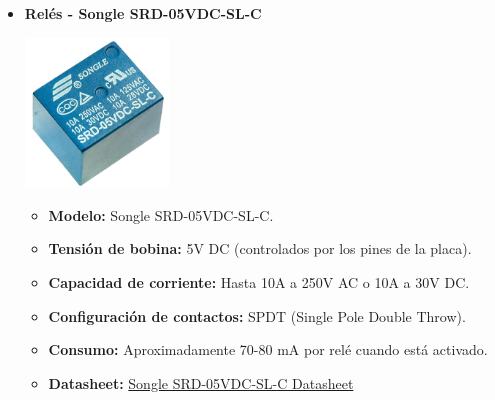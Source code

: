\begin{itemize}
    \item \textbf{Relés - Songle SRD-05VDC-SL-C} 
    \begin{center}
        \includegraphics[width=0.3\textwidth]{Imagenes/rele component.png}
    \end{center}
    \begin{itemize}
        \item \textbf{Modelo:} Songle SRD-05VDC-SL-C.
        \item \textbf{Tensión de bobina:} 5V DC (controlados por los pines de la placa).
        \item \textbf{Capacidad de corriente:} Hasta 10A a 250V AC o 10A a 30V DC.
        \item \textbf{Configuración de contactos:} SPDT (Single Pole Double Throw).
        \item \textbf{Consumo:} Aproximadamente 70-80 mA por relé cuando está activado.
        \item \textbf{Datasheet:} \href{}{Songle SRD-05VDC-SL-C Datasheet}
    \end{itemize}
\end{itemize}
